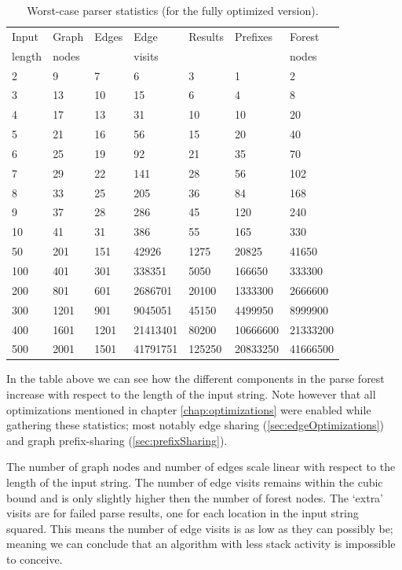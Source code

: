 \documentclass[a4paper,10pt]{article}
\begin{document}
\begin{table}[H]
\centering
\begin{tabular}{ | p{7ex} | p{7ex} | p{7ex} | p{10ex} | p{8ex} | p{10ex} | p{10ex} | }
  \hline
  Input & Graph & Edges & Edge & Results & Prefixes & Forest \\
  length & nodes & & visits & & & nodes \\
  \hline
  2 & 9 & 7 & 6 & 3 & 1 & 2 \\
  3 & 13 & 10 & 15 & 6 & 4 & 8 \\
  4 & 17 & 13 & 31 & 10 & 10 & 20 \\
  5 & 21 & 16 & 56 & 15 & 20 & 40 \\
  6 & 25 & 19 & 92 & 21 & 35 & 70 \\
  7 & 29 & 22 & 141 & 28 & 56 & 102 \\
  8 & 33 & 25 & 205 & 36 & 84 & 168 \\
  9 & 37 & 28 & 286 & 45 & 120 & 240 \\
  10 & 41 & 31 & 386 & 55 & 165 & 330 \\
  \hline
  50 & 201 & 151 & 42926 & 1275 & 20825 & 41650 \\
  100 & 401 & 301 & 338351 & 5050 & 166650 & 333300 \\
  200 & 801 & 601 & 2686701 & 20100 & 1333300 & 2666600 \\
  300 & 1201 & 901 & 9045051 & 45150 & 4499950 & 8999900 \\
  400 & 1601 & 1201 & 21413401 & 80200 & 10666600 & 21333200 \\
  500 & 2001 & 1501 & 41791751 & 125250 & 20833250 & 41666500 \\
  \hline
\end{tabular}
\caption{Worst-case parser statistics (for the fully optimized version).}
\end{table}

In the table above we can see how the different components in the parse forest increase with respect to the length of the input string. Note however that all optimizations mentioned in chapter \ref{chap:optimizations} were enabled while gathering these statistics; most notably edge sharing (\ref{sec:edgeOptimizations}) and graph prefix-sharing (\ref{sec:prefixSharing}).

The number of graph nodes and number of edges scale linear with respect to the length of the input string. The number of edge visits remains within the cubic bound and is only slightly higher then the number of forest nodes. The `extra' visits are for failed parse results, one for each location in the input string squared. This means the number of edge visits is as low as they can possibly be; meaning we can conclude that an algorithm with less stack activity is impossible to conceive.
\end{document}
